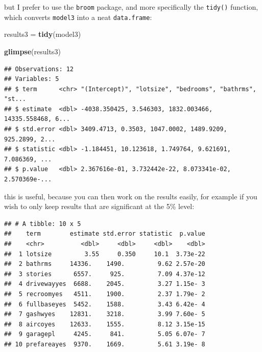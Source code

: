 \documentclass[]{gitbook}
\newenvironment{Shaded}{\begin{snugshade}}{\end{snugshade}}
\newcommand{\FloatTok}[1]{\textcolor[rgb]{0.00,0.00,0.81}{#1}}
\newcommand{\KeywordTok}[1]{\textcolor[rgb]{0.13,0.29,0.53}{\textbf{#1}}}
\newcommand{\NormalTok}[1]{#1}
\newcommand{\OperatorTok}[1]{\textcolor[rgb]{0.81,0.36,0.00}{\textbf{#1}}}
\newcommand{\StringTok}[1]{\textcolor[rgb]{0.31,0.60,0.02}{#1}}
\theoremstyle{definition}
\theoremstyle{definition}
\theoremstyle{definition}
\theoremstyle{remark}
\begin{document}
but I prefer to use the \texttt{broom} package, and more specifically
the \texttt{tidy()} function, which converts \texttt{model3} into a neat
\texttt{data.frame}:

\begin{Shaded}
\begin{Highlighting}[]
\NormalTok{results3 =}\StringTok{ }\KeywordTok{tidy}\NormalTok{(model3)}

\KeywordTok{glimpse}\NormalTok{(results3)}
\end{Highlighting}
\end{Shaded}

\begin{verbatim}
## Observations: 12
## Variables: 5
## $ term      <chr> "(Intercept)", "lotsize", "bedrooms", "bathrms", "st...
## $ estimate  <dbl> -4038.350425, 3.546303, 1832.003466, 14335.558468, 6...
## $ std.error <dbl> 3409.4713, 0.3503, 1047.0002, 1489.9209, 925.2899, 2...
## $ statistic <dbl> -1.184451, 10.123618, 1.749764, 9.621691, 7.086369, ...
## $ p.value   <dbl> 2.367616e-01, 3.732442e-22, 8.073341e-02, 2.570369e-...
\end{verbatim}

this is useful, because you can then work on the results easily, for
example if you wish to only keep results that are significant at the 5\%
level:

\begin{Shaded}
\end{Shaded}

\begin{verbatim}
## # A tibble: 10 x 5
##    term        estimate std.error statistic  p.value
##    <chr>          <dbl>     <dbl>     <dbl>    <dbl>
##  1 lotsize         3.55     0.350     10.1  3.73e-22
##  2 bathrms     14336.    1490.         9.62 2.57e-20
##  3 stories      6557.     925.         7.09 4.37e-12
##  4 drivewayyes  6688.    2045.         3.27 1.15e- 3
##  5 recroomyes   4511.    1900.         2.37 1.79e- 2
##  6 fullbaseyes  5452.    1588.         3.43 6.42e- 4
##  7 gashwyes    12831.    3218.         3.99 7.60e- 5
##  8 aircoyes    12633.    1555.         8.12 3.15e-15
##  9 garagepl     4245.     841.         5.05 6.07e- 7
## 10 prefareayes  9370.    1669.         5.61 3.19e- 8
\end{verbatim}
\end{document}

